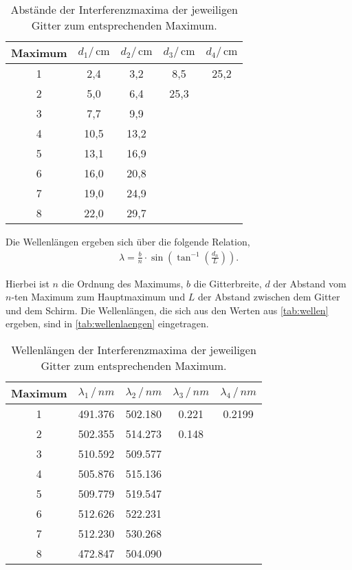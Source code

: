 \begin{table}[H]
  \centering
  \caption{Abstände der Interferenzmaxima der jeweiligen Gitter zum entsprechenden Maximum.}
  \label{tab:wellen}
  \begin{tabular}{c c c c c}
      \toprule
      Maximum & $d_1/\,\si{\centi\meter}$ & $d_2/\,\si{\centi\meter}$ & $d_3/\,\si{\centi\meter}$ & $d_4/\,\si{\centi\meter}$ \\
      \midrule
      1 & 2,4 & 3,2 & 8,5 & 25,2\\  
      2 & 5,0 & 6,4 & 25,3 &    \\  
      3 & 7,7 & 9,9 &       &   \\  
      4 & 10,5 & 13,2 &     &   \\
      5 & 13,1 & 16,9 &     &   \\
      6 & 16,0 & 20,8 &     &   \\
      7 & 19,0 & 24,9 &     &   \\
      8 & 22,0 & 29,7 &     &   \\
      \bottomrule
  \end{tabular}
\end{table}

\noindent
Die Wellenlängen ergeben sich über die folgende Relation,
\begin{align}
  \lambda = \frac{b}{n}\cdot\sin\left(\tan^{-1}\left(\frac{d_n}{L}\right)\right).
\end{align}

\noindent
Hierbei ist $n$ die Ordnung des Maximums, $b$ die Gitterbreite, $d$ der Abstand vom $n$-ten Maximum zum Hauptmaximum und $L$ der Abstand zwischen dem Gitter und dem Schirm.
Die Wellenlängen, die sich aus den Werten aus \autoref{tab:wellen} ergeben, sind in \autoref{tab:wellenlaengen} eingetragen.

\begin{table}[H]
  \centering
  \caption{Wellenlängen der Interferenzmaxima der jeweiligen Gitter zum entsprechenden Maximum.}
  \label{tab:wellenlaengen}
  \begin{tabular}{c c c c c}
      \toprule
      Maximum & $\lambda_1 \,/\,\si{nm}$ & $\lambda_2 \,/\,\si{nm}$ & $\lambda_3 \,/\,\si{nm}$ & $\lambda_4 \,/\,\si{nm}$\\
      \midrule
      1 & 491.376 & 502.180   & 0.221   & 0.2199  \\  
      2 & 502.355 & 514.273   & 0.148  &       \\  
      3 & 510.592 & 509.577   &       &       \\  
      4 & 505.876 & 515.136 &       &       \\
      5 & 509.779 & 519.547 &       &       \\
      6 & 512.626 & 522.231 &       &       \\
      7 & 512.230 & 530.268 &       &       \\
      8 & 472.847 & 504.090 &       &       \\
      \bottomrule
  \end{tabular}
\end{table}


